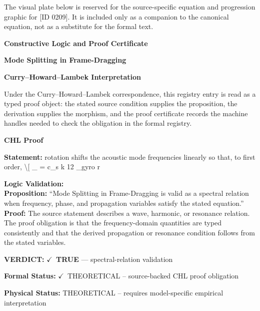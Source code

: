 \begingroup\footnotesize\sloppy
The visual plate below is reserved for the source-specific equation and progression graphic for [ID 0209]. It is included only as a companion to the canonical equation, not as a substitute for the formal text.
\par\endgroup
\ifTZPDarkEdition
{}
\fi

\clearpage
\begingroup\tzpsupportsetup
\noindent\textbf{\fontsize{10.8pt}{12.8pt}\selectfont [ID 0209] Constructive Logic and Proof Certificate}\par
\noindent\textbf{\fontsize{10pt}{12pt}\selectfont Mode Splitting in Frame-Dragging}\par
\vspace{0.45em}
\begingroup
\footnotesize
\setlength{\parskip}{0.22em}
\setlength{\parindent}{0pt}
\noindent\textbf{Curry--Howard--Lambek Interpretation}\par
Under the Curry--Howard--Lambek correspondence, this registry entry is read as a typed proof
object: the stated source condition supplies the proposition, the derivation supplies the
morphism, and the proof certificate records the machine handles needed to check the obligation
in the formal registry.

\vspace{0.45em}
\noindent\textbf{CHL Proof}\par
\textbf{Statement:} rotation shifts the acoustic mode frequencies linearly so that, to first order, \textbackslash{}[ \_ =
c\_s k 12 \_gyro r

\textbf{Logic Validation:}\\
\textbf{Proposition:} ``Mode Splitting in Frame-Dragging is valid as a spectral relation when frequency, phase,
and propagation variables satisfy the stated equation.''\\
\textbf{Proof:} The source statement describes a wave, harmonic, or resonance relation. The proof
obligation is that the frequency-domain quantities are typed consistently and that the
derived propagation or resonance condition follows from the stated variables.

\textbf{VERDICT:} \ensuremath{\checkmark}\ \textbf{TRUE} --- spectral-relation validation

\textbf{Formal Status:} \ensuremath{\checkmark}\ THEORETICAL -- source-backed CHL proof obligation

\textbf{Physical Status:} THEORETICAL -- requires model-specific empirical interpretation
\par\vspace{0.45em}
\par
\ifTZPDarkEdition
{}
\fi
\endgroup
\endgroup

